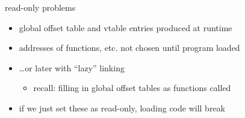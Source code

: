 \begin{frame}{read-only problems}
    \begin{itemize}
    \item global offset table and vtable entries produced at runtime
    \item addresses of functions, etc. not chosen until program loaded
    \item \ldots or later with ``lazy'' linking
        \begin{itemize}
        \item recall: filling in global offset tables as functions called
        \end{itemize}
    \vspace{.5cm}
    \item if we just set these as read-only, loading code will break
    \end{itemize}
\end{frame}

